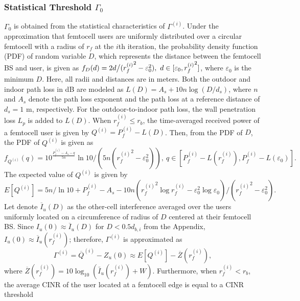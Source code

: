 \documentclass[draftclsnofoot,12pt,onecolumn]{IEEEtran}
\begin{document}
\subsubsection{Statistical Threshold $\Gamma_{0}$}
$\Gamma_{0}$ is obtained from the statistical characteristics of
$\Gamma^{(i)}$. Under the approximation that femtocell users are
uniformly distributed over a circular femtocell with a radius of
$r_f$ at the $i$th iteration, the probability density function (PDF)
of random variable $D$, which represents the distance between the
femtocell BS and user, is given as
$f_D(d)=2d\big{/}({r_f^{(i)}}^2-\varepsilon_0^2),
~d\in[\varepsilon_0,{r_f^{(i)}}^2]$,
where $\varepsilon_0$ is the minimum $D$. Here, all radii and
distances are in meters. Both the outdoor and indoor path loss in dB
are modeled as $L(D)=A_s+10n\log\left(D/d_s\right)$, where $n$ and
$A_s$ denote the path loss exponent and the path loss at a reference
distance of $d_s=1$ m, respectively. For the outdoor-to-indoor path
loss, the wall penetration loss $L_p$ is added to $L(D)$. When
$r_f^{(i)}\leq r_b$, the time-averaged received power of a femtocell
user is given by $ Q^{(i)}=P_f^{(i)}-L\left(D\right)$. Then, from
the PDF of $D$, the PDF of $Q^{(i)}$ is given as
\begin{equation}
f_{Q^{(i)}}(q)=10^{\frac{P_f^{(i)}-A_s-q}{5n}}\ln10\Big/(5n({r_f^{(i)}}^2-\varepsilon_0^2)),
~q\in\left[P_f^{(i)}-L(r_f^{(i)}),
P_f^{(i)}-L(\varepsilon_0)\right].\label{eq:PDF_R}
\end{equation}
The expected value of $Q^{(i)}$ is given by
\begin{equation}
E\left[Q^{(i)}\right]=5n/\ln10+P_f^{(i)}-A_s-10n({r_f^{(i)}}^2\log
r_f^{(i)}-\varepsilon_0^2\log\varepsilon_0)
\Big/({r_f^{(i)}}^2-\varepsilon_0^2). \label{eq:E_R}
\end{equation}
Let denote $\overline{I}_u(D)$ as the other-cell interference averaged over the users uniformly located on a circumference of radius of $D$ centered at their femtocell BS. Since $I_u(0) \approx \overline{I}_u(D)$ for $D < 0.5 d_{b,i}$ from the Appendix, $I_u(0)\approx \overline{I}_u(r_f^{(i)})$; therefore,
$\Gamma^{(i)}$ is approximated as
\begin{equation}
\Gamma^{(i)}=\overline{Q}^{(i)}-Z_u(0)\approx
E\left[Q^{(i)}\right]-\overline{Z}(r_f^{(i)}), \label{eq:Gamma1}
\end{equation}
where
$\overline{Z}(r_f^{(i)})=10\log_{10}\left(\bar{I}_u(r_f^{(i)})+W\right)$.
Furthermore, when $r_f^{(i)}<r_b$, the average CINR of the user
located at a femtocell edge is equal to a CINR threshold
\end{document}

